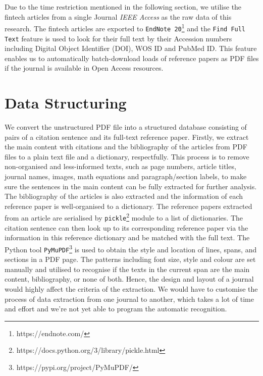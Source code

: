 Due to the time restriction mentioned in the following section, we utilise the fintech articles from a single Journal \textit{IEEE Access} as the raw data of this research.
The fintech articles are exported to \texttt{EndNote 20}\footnote{https://endnote.com/} and the \texttt{Find Full Text} feature is used to look for their full text by their Accession numbers including Digital Object Identifier (DOI), WOS ID and PubMed ID.
This feature enables us to automatically batch-download loads of reference papers as PDF files if the journal is available in Open Access resources.

\section{Data Structuring}
We convert the unstructured PDF file into a structured database consisting of pairs of a citation sentence and its full-text reference paper.
Firstly, we extract the main content with citations and the bibliography of the articles from PDF files to a plain text file and a dictionary, respectfully.
This process is to remove non-organised and less-informed texts, such as page numbers, article titles, journal names, images, math equations and paragraph/section labels, to make sure the sentences in the main content can be fully extracted for further analysis.
The bibliography of the articles is also extracted and the information of each reference paper is well-organised to a dictionary.
The reference papers extracted from an article are serialised by \texttt{pickle}\footnote{https://docs.python.org/3/library/pickle.html} module to a list of dictionaries.
The citation sentence can then look up to its corresponding reference paper via the information in this reference dictionary and be matched with the full text.
The Python tool \texttt{PyMuPDF}\footnote{https://pypi.org/project/PyMuPDF/} is used to obtain the style and location of lines, spans, and sections in a PDF page.
The patterns including font size, style and colour are set manually and utilised to recognise if the texts in the current span are the main content, bibliography, or none of both.
Hence, the design and layout of a journal would highly affect the criteria of the extraction.
We would have to customise the process of data extraction from one journal to another, which takes a lot of time and effort and we're not yet able to program the automatic recognition.

